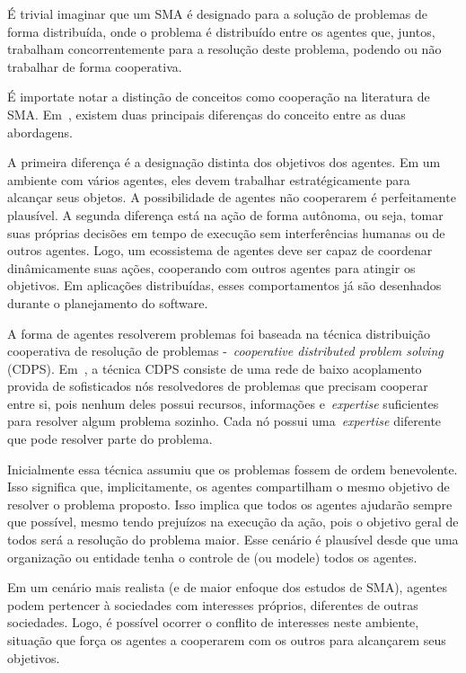 É trivial imaginar que um SMA é designado para a solução de problemas de forma distribuída, onde o problema é distribuído entre os agentes que, juntos, trabalham concorrentemente para a resolução deste problema, podendo ou não trabalhar de forma cooperativa.

É importate notar a distinção de conceitos como cooperação na literatura de SMA. Em~\cite{wooldridge04}, existem duas principais diferenças do conceito entre as duas abordagens.

A primeira diferença é a designação distinta dos objetivos dos agentes. Em um ambiente com vários agentes, eles devem trabalhar estratégicamente para alcançar seus objetos. A possibilidade de agentes não cooperarem é perfeitamente plausível. A segunda diferença está na ação de forma autônoma, ou seja, tomar suas próprias decisões em tempo de execução sem interferências humanas ou de outros agentes. Logo, um ecossistema de agentes deve ser capaz de coordenar dinâmicamente suas ações, cooperando com outros agentes para atingir os objetivos. Em aplicações distribuídas, esses comportamentos já são desenhados durante o planejamento do software.

A forma de agentes resolverem problemas foi baseada na técnica distribuição cooperativa de resolução de problemas -~\emph{cooperative distributed problem solving} (CDPS). Em~\cite{durfee89}, a técnica CDPS consiste de uma rede de baixo acoplamento provida de sofisticados nós resolvedores de problemas que precisam cooperar entre si, pois nenhum deles possui recursos, informações e~\emph{expertise} suficientes para resolver algum problema sozinho. Cada nó possui uma~\emph{expertise} diferente que pode resolver parte do problema.

Inicialmente essa técnica assumiu que os problemas fossem de ordem benevolente. Isso significa que, implicitamente, os agentes compartilham o mesmo objetivo de resolver o problema proposto. Isso implica que todos os agentes ajudarão sempre que possível, mesmo tendo prejuízos na execução da ação, pois o objetivo geral de todos será a resolução do problema maior. Esse cenário é plausível desde que uma organização ou entidade tenha o controle de (ou modele) todos os agentes.

Em um cenário mais realista (e de maior enfoque dos estudos de SMA), agentes podem pertencer à sociedades com interesses próprios, diferentes de outras sociedades. Logo, é possível ocorrer o conflito de interesses neste ambiente, situação que força os agentes a cooperarem com os outros para alcançarem seus objetivos.

